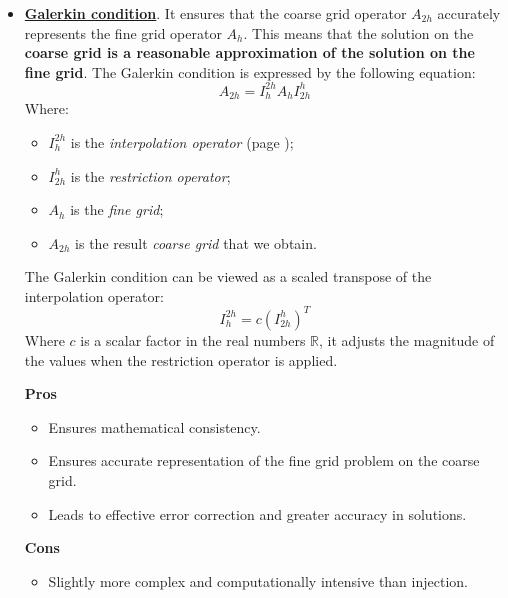 \begin{itemize}
	\item \underline{\textbf{Galerkin condition}}. It ensures that the coarse grid operator $A_{2h}$ accurately represents the fine grid operator $A_{h}$. This means that the solution on the \textbf{coarse grid is a reasonable approximation of the solution on the fine grid}. The Galerkin condition is expressed by the following equation:
	\begin{equation}
		A_{2h} = I_{h}^{2h} A_{h} I_{2h}^{h}
	\end{equation}
	Where:
	\begin{itemize}
		\item $I_{h}^{2h}$ is the \emph{interpolation operator} (page \pageref{subsubsection: Interpolation Operator});
		\item $I_{2h}^{h}$ is the \emph{restriction operator};
		\item $A_{h}$ is the \emph{fine grid};
		\item $A_{2h}$ is the result \emph{coarse grid} that we obtain.
	\end{itemize}
	The Galerkin condition can be viewed as a scaled transpose of the interpolation operator:
	\begin{equation}
		I_{h}^{2h} = c \left( I_{2h}^{h} \right)^{T}
	\end{equation}
	Where $c$ is a scalar factor in the real numbers $\mathbb{R}$, it adjusts the magnitude of the values when the restriction operator is applied.
	\begin{flushleft}
		\textcolor{Green3}{ \textbf{Pros}}
	\end{flushleft}
	\begin{itemize}
		\item Ensures mathematical consistency.
		\item Ensures accurate representation of the fine grid problem on the coarse grid.
		\item Leads to effective error correction and greater accuracy in solutions.
	\end{itemize}
	\begin{flushleft}
		\textcolor{Red2}{ \textbf{Cons}}
	\end{flushleft}
	\begin{itemize}
		\item Slightly more complex and computationally intensive than injection.
	\end{itemize}
\end{itemize}